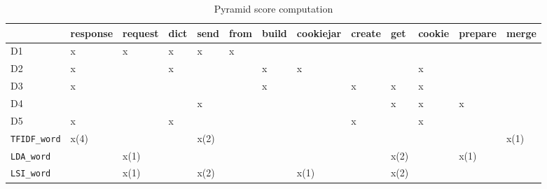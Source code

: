 \begin{table}[h]
\small
\caption{Pyramid score computation }
\label{table-pyramid1}
\centering
\begin{tabular}{|l|l|l|l|l|l|l|l|l|l|l|l|l|}
\hline
  & response & request &	dict &	send &	from &	build &	cookiejar &	create &	get &	cookie &	prepare &	merge  \\ \hline
D1 & x      & x     & x           & x   & x    &        &         &     &      &    &  &    \\ \hline
D2 &     x   &      &  x       &     &    & x      & x       &   &      & x& &       \\ \hline
D3 & x      &       &           &    &     &    x    &         & x   &  x    & x & &     \\ \hline
D4 &        &       &             &   x  &     &        &        &     & x    & x    & x &    \\ \hline
D5 &  x     &      &    x         &     &     &        &        & x    &     & x    &  &   \\ \hline
\texttt{TFIDF\_word}  &   x(4)     &       &             &  x(2)   &  &        &     &     &  &  & & x(1)    \\ \hline
\texttt{LDA\_word}  &        &   x(1)    &             &     &  &        &     &     & x(2) &   & x(1) &  \\ \hline
\texttt{LSI\_word}  &        &   x(1)    &             &  x(2)   &   &        &  x(1)     &     & x(2) &  & & \\ \hline
\end{tabular}
\end{table}

